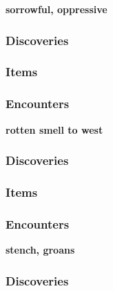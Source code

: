 \textbf{sorrowful, oppressive}
\begin{DndReadAloud}
\end{DndReadAloud}
\subsubsection{Discoveries}
\begin{itemize}
\end{itemize}
\subsubsection{Items}
\begin{itemize}
\end{itemize}
\subsubsection{Encounters}
\begin{itemize}
\end{itemize}

\textbf{rotten smell to west}
\begin{DndReadAloud}
\end{DndReadAloud}
\subsubsection{Discoveries}
\begin{itemize}
\end{itemize}
\subsubsection{Items}
\begin{itemize}
\end{itemize}
\subsubsection{Encounters}
\begin{itemize}
\end{itemize}

\textbf{stench, groans}
\begin{DndReadAloud}
\end{DndReadAloud}
\subsubsection{Discoveries}
\begin{itemize}
\end{itemize}
